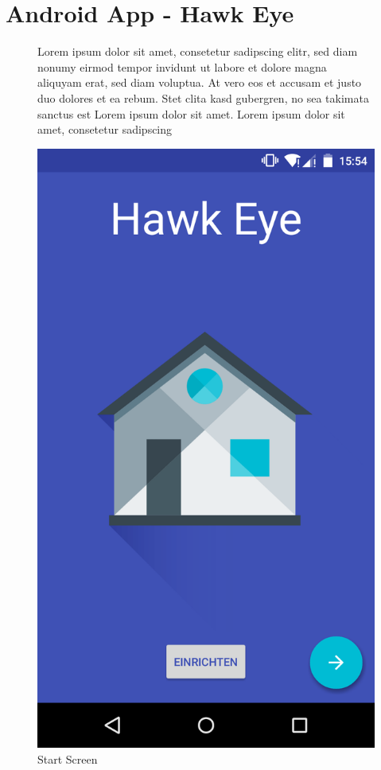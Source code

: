 \section*{Android App - Hawk Eye}
\label{sec:manualAndroidApp}
\begin{figure}[htbp]
	\begin{minipage}{0.6\textwidth} 
Lorem ipsum dolor sit amet, consetetur sadipscing elitr, sed diam nonumy eirmod tempor invidunt ut labore et dolore magna aliquyam erat, sed diam voluptua. At vero eos et accusam et justo duo dolores et ea rebum. Stet clita kasd gubergren, no sea takimata sanctus est Lorem ipsum dolor sit amet. Lorem ipsum dolor sit amet, consetetur sadipscing 
	\end{minipage}
	\hfill
	\begin{minipage}{0.32\textwidth}
		\includegraphics[scale=0.12]{appendix/img/AppScreenshots/Screenshot1}
		\caption{Start Screen}
		\label{fig:screenshot_1}
	\end{minipage}
\end{figure}


